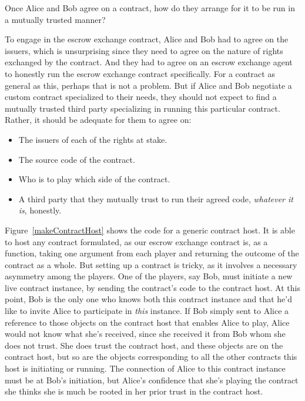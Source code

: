 \documentclass{llncs}
\begin{document}
Once Alice and Bob agree on a contract, how do they arrange for it to be run in a mutually trusted manner?

To engage in the escrow exchange contract, Alice and Bob had to agree on the issuers, which is unsurprising since they need to agree on the nature of rights exchanged by the contract. And they had to agree on an escrow exchange agent to honestly run the escrow exchange contract specifically. For a contract as general as this, perhaps that is not a problem. But if Alice and Bob negotiate a custom contract specialized to their needs, they should not expect to find a mutually trusted third party specializing in running this particular contract. Rather, it should be adequate for them to agree on:

\begin{itemize}
\item The issuers of each of the rights at stake.
\item The source code of the contract.
\item Who is to play which side of the contract.
\item A third party that they mutually trust to run their agreed code, \emph{whatever it is}, honestly.
\end{itemize}

Figure~\ref{makeContractHost} shows the code for a generic contract host. It is able to host any contract formulated, as our escrow exchange contract is, as a function, taking one argument from each player and returning the outcome of the contract as a whole. But setting up a contract is tricky, as it involves a necessary asymmetry among the players. One of the players, say Bob, must initiate a new live contract instance, by sending the contract's code to the contract host. At this point, Bob is the only one who knows both this contract instance and that he'd like to invite Alice to participate in \emph{this} instance. If Bob simply sent to Alice a reference to those objects on the contract host that enables Alice to play, Alice would not know what she's received, since she received it from Bob whom she does not trust. She does trust the contract host, and these objects are on the contract host, but so are the objects corresponding to all the other contracts this host is initiating or running. The connection of Alice to this contract instance must be at Bob's initiation, but Alice's confidence that she's playing the contract she thinks she is much be rooted in her prior trust in the contract host.
\end{document}
